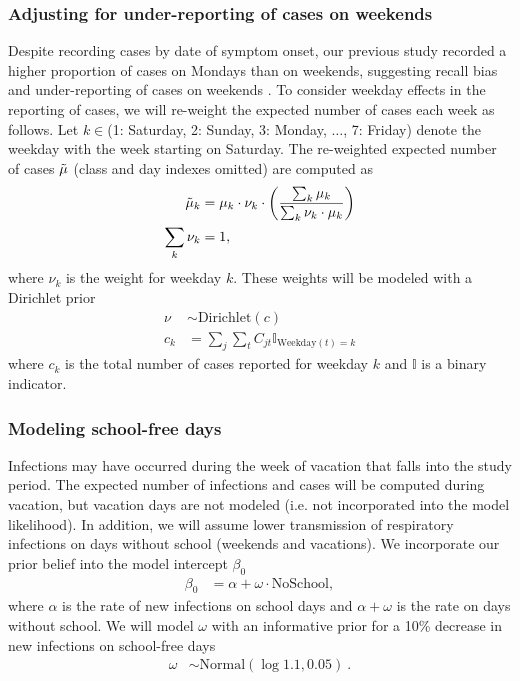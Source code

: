 \documentclass{article}
\begin{document}
\subsubsection*{Adjusting for under-reporting of cases on weekends}

Despite recording cases by date of symptom onset, our previous study recorded a higher proportion of cases on Mondays than on weekends, suggesting recall bias and under-reporting of cases on weekends \cite{Banholzer2023PLoSMed}. To consider weekday effects in the reporting of cases, we will re-weight the expected number of cases each week as follows. Let $k \in $(1: Saturday, 2: Sunday, 3: Monday, $\dots$, 7: Friday) denote the weekday with the week starting on Saturday. The re-weighted expected number of cases $\Tilde{\mu}$ (class and day indexes omitted) are computed as
\begin{align*}
    \Tilde{\mu}_{k} &= \mu_k \cdot \nu_k \cdot \left(\frac{\sum_k \mu_k}{\sum_k \nu_k \cdot \mu_k}\right)\\
    \sum_k \nu_k &= 1,
\end{align*}
where $\nu_k$ is the weight for weekday $k$. These weights will be modeled with a Dirichlet prior
\begin{align*}
    \nu &\sim \text{Dirichlet}(c) \\
    c_k &= \sum_j \sum_t C_{jt} \mathbb{I}_{\text{Weekday}(t)=k}
\end{align*}
where $c_k$ is the total number of cases reported for weekday $k$ and $\mathbb{I}$ is a binary indicator. 

\subsubsection*{Modeling school-free days}

Infections may have occurred during the week of vacation that falls into the study period. The expected number of infections and cases will be computed during vacation, but vacation days are not modeled (i.e. not incorporated into the model likelihood). In addition, we will assume lower transmission of respiratory infections on days without school (weekends and vacations). We incorporate our prior belief into the model intercept $\beta_0$  
\begin{align*}
    \beta_0 &= \alpha + \omega \cdot \text{NoSchool},
\end{align*}
where $\alpha$ is the rate of new infections on school days and $\alpha + \omega$ is the rate on days without school. We will model $\omega$ with an informative prior for a 10\% decrease in new infections on school-free days
\begin{align*}
    \omega &\sim \text{Normal}(\log 1.1, 0.05)~.
\end{align*}
\end{document}
